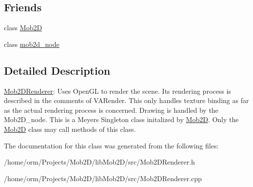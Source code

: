 \subsection*{Friends}
\begin{DoxyCompactItemize}
\item 
\hypertarget{classMob2DRenderer_a0fc2385ff5105fb560cc996a6e9cb922}{
class \hyperlink{classMob2DRenderer_a0fc2385ff5105fb560cc996a6e9cb922}{Mob2D}}
\label{classMob2DRenderer_a0fc2385ff5105fb560cc996a6e9cb922}

\item 
\hypertarget{classMob2DRenderer_a8062666e3cdb41d93575a5739308bb29}{
class \hyperlink{classMob2DRenderer_a8062666e3cdb41d93575a5739308bb29}{mob2d\_\-node}}
\label{classMob2DRenderer_a8062666e3cdb41d93575a5739308bb29}

\end{DoxyCompactItemize}


\subsection{Detailed Description}
\hyperlink{classMob2DRenderer}{Mob2DRenderer}: Uses OpenGL to render the scene. Its rendering process is described in the comments of VARender. This only handles texture binding as far as the actual rendering process is concerned. Drawing is handled by the Mob2D\_\-node. This is a Meyers Singleton class initalized by \hyperlink{classMob2D}{Mob2D}. Only the \hyperlink{classMob2D}{Mob2D} class may call methods of this class. 

The documentation for this class was generated from the following files:\begin{DoxyCompactItemize}
\item 
/home/orm/Projects/Mob2D/libMob2D/src/Mob2DRenderer.h\item 
/home/orm/Projects/Mob2D/libMob2D/src/Mob2DRenderer.cpp\end{DoxyCompactItemize}
